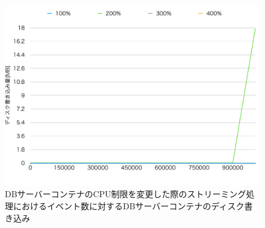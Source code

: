 \documentclass[../../../../../main]{subfiles}
\begin{document}
    \begin{figure}[H]
        \centering
        \includegraphics[width=12cm]{graph}
        \caption{DBサーバーコンテナのCPU制限を変更した際のストリーミング処理におけるイベント数に対するDBサーバーコンテナのディスク書き込み}
        \label{fig:stream-change-db-cpu-limit-db-disk-in-app_4_8192-db_1024}
    \end{figure}
\end{document}
